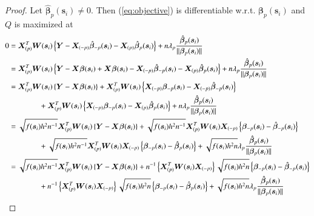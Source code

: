 \documentclass[authoryear, review, 11pt]{elsarticle}
\begin{document}
\begin{proof}
      Let $\hat{\bm{\beta}}_p(\bm{s}_i) \ne 0$. Then (\ref{eq:objective}) is differentiable w.r.t. $\bm{\beta}_p(\bm{s}_i)$ and $Q$ is maximized at
      \begin{align}\label{eq:selection}
        0 &= \bm{X}_{(p)}^T \bm{W}(\bm{s}_i) \left\{ \bm{Y} - \bm{X}_{(-p)} \hat{\bm{\beta}}_{-p}(\bm{s}_i) - \bm{X}_{(p)} \hat{\bm{\beta}}_p(\bm{s}_i) \right\} + n \lambda_p \frac{ \hat{\bm{\beta}}_p(\bm{s}_i) }{\| \bm{\beta}_p(\bm{s}_i) \|} \notag \\
        &= \bm{X}_{(p)}^T \bm{W}(\bm{s}_i) \left\{ \bm{Y} - \bm{X} \bm{\beta}(\bm{s}_i) + \bm{X} \bm{\beta}(\bm{s}_i) -  \bm{X}_{(-p)} \hat{\bm{\beta}}_{-p}(\bm{s}_i) - \bm{X}_{(p)} \hat{\bm{\beta}}_p(\bm{s}_i) \right\} + n \lambda_p \frac{ \hat{\bm{\beta}}_p(\bm{s}_i) }{\| \bm{\beta}_p(\bm{s}_i) \|} \notag \\
        &= \bm{X}_{(p)}^T \bm{W}(\bm{s}_i) \left\{ \bm{Y} - \bm{X} \bm{\beta}(\bm{s}_i) \right\} + \bm{X}_{(p)}^T \bm{W}(\bm{s}_i) \left\{ \bm{X}_{(-p)} \bm{\beta}_{-p}(\bm{s}_i) - \bm{X}_{(-p)} \hat{\bm{\beta}}_{-p}(\bm{s}_i) \right\} \notag \\
        &\mkern+72mu+ \bm{X}_{(p)}^T \bm{W}(\bm{s}_i) \left\{ \bm{X}_{(-p)} \bm{\beta}_{-p}(\bm{s}_i) - \bm{X}_{(p)} \hat{\bm{\beta}}_p(\bm{s}_i) \right\} + n \lambda_p \frac{ \hat{\bm{\beta}}_p(\bm{s}_i) }{\| \bm{\beta}_p(\bm{s}_i) \|} \notag \\
        &= \sqrt{f(\bm{s}_i) h^2 n^{-1}} \bm{X}_{(p)}^T \bm{W}(\bm{s}_i) \left\{ \bm{Y} - \bm{X} \bm{\beta}(\bm{s}_i) \right\} + \sqrt{f(\bm{s}_i) h^2 n^{-1}} \bm{X}_{(p)}^T  \bm{W}(\bm{s}_i) \bm{X}_{(-p)} \left\{ \bm{\beta}_{-p}(\bm{s}_i) - \hat{\bm{\beta}}_{-p}(\bm{s}_i) \right\} \notag \\
        &\mkern+72mu+ \sqrt{f(\bm{s}_i) h^2 n^{-1}} \bm{X}_{(p)}^T \bm{W}(\bm{s}_i) \bm{X}_{(-p)} \left\{ \bm{\beta}_{-p}(\bm{s}_i) - \hat{\bm{\beta}}_p(\bm{s}_i) \right\} + \sqrt{f(\bm{s}_i) h^2 n} \lambda_p \frac{ \hat{\bm{\beta}}_p(\bm{s}_i) }{\| \bm{\beta}_p(\bm{s}_i) \|} \notag \\
        &= \sqrt{f(\bm{s}_i) h^2 n^{-1}} \bm{X}_{(p)}^T \bm{W}(\bm{s}_i) \left\{ \bm{Y} - \bm{X} \bm{\beta}(\bm{s}_i) \right\} +  n^{-1} \left\{ \bm{X}_{(p)}^T  \bm{W}(\bm{s}_i) \bm{X}_{(-p)} \right\} \sqrt{f(\bm{s}_i) h^2 n} \left\{ \bm{\beta}_{-p}(\bm{s}_i) - \hat{\bm{\beta}}_{-p}(\bm{s}_i) \right\} \notag \\
        &\mkern+72mu+ n^{-1} \left\{ \bm{X}_{(p)}^T \bm{W}(\bm{s}_i) \bm{X}_{(-p)} \right\} \sqrt{f(\bm{s}_i) h^2 n} \left\{ \bm{\beta}_{-p}(\bm{s}_i) - \hat{\bm{\beta}}_p(\bm{s}_i) \right\} + \sqrt{f(\bm{s}_i) h^2 n} \lambda_p \frac{ \hat{\bm{\beta}}_p(\bm{s}_i) }{\| \bm{\beta}_p(\bm{s}_i) \|}
      \end{align}
      

\end{proof}
\end{document}
